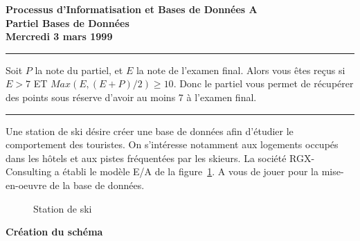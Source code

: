 \documentclass{article}
\begin{document}
\begin{center}
\Large\bf Processus d'Informatisation et Bases de Donn\'ees A \\ 
    Partiel Bases de Donn\'ees\\
\large\bf Mercredi 3 mars 1999
\end{center}


\vspace*{2cm}

\hrule

Soit $P$ la note du partiel, et $E$ la note
de l'examen final. Alors vous \^etes re\c{c}us si
$E > 7$ ET $Max (E, (E+P)/2) \ge 10$. Donc le partiel vous
permet de r\'ecup\'erer des points sous r\'eserve
d'avoir au moins
7 \`a l'examen final.

\smallskip

\hrule

\vspace*{2cm}

Une station de ski d\'esire cr\'eer une base de donn\'ees
afin d'\'etudier le comportement des touristes. On
s'int\'eresse notamment aux logements occup\'es
dans les h\^otels
et aux pistes fr\'equent\'ees par les skieurs.
La soci\'et\'e RGX-Consulting a \'etabli le
mod\`ele E/A de la figure~\ref{ski}. 
A vous de jouer pour la mise-en-oeuvre de la 
base de donn\'ees.

  \begin{figure}[htb]  
    \centerline{}  
    \caption{Station de ski}  
    \label{ski}  
  \end{figure}  

\smallskip
{\bf Cr\'eation du sch\'ema}
\end{document}
